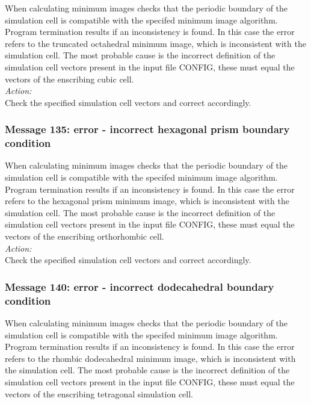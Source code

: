 When calculating minimum images \D{} checks that the periodic
boundary of the simulation cell is compatible with the specifed
minimum image algorithm. Program termination results if an
inconsistency is found. In this case the error refers to the truncated
octahedral minimum image, which is inconsistent with the simulation
cell. The most probable cause is the incorrect definition of the
simulation cell vectors present in the input file CONFIG, these must
equal the vectors of the enscribing cubic cell. \\ 

\noindent
{\em Action:} \\ 
Check the specified simulation cell vectors and correct accordingly.

\subsubsection*{Message 135: error - incorrect hexagonal prism boundary condition}

When calculating minimum images \D{} checks that the periodic
boundary of the simulation cell is compatible with the specifed
minimum image algorithm. Program termination results if an
inconsistency is found. In this case the error refers to the hexagonal
prism minimum image, which is inconsistent with the simulation
cell. The most probable cause is the incorrect definition of the
simulation cell vectors present in the input file CONFIG, these must
equal the vectors of the enscribing orthorhombic cell. \\ 

\noindent
{\em Action:} \\ 
Check the specified simulation cell vectors and correct accordingly.

\subsubsection*{Message 140: error - incorrect dodecahedral boundary condition}

When calculating minimum images \D{} checks that the periodic
boundary of the simulation cell is compatible with the specifed
minimum image algorithm. Program termination results if an
inconsistency is found. In this case the error refers to the rhombic
dodecahedral minimum image, which is inconsistent with the simulation
cell. The most probable cause is the incorrect definition of the
simulation cell vectors present in the input file CONFIG, these must
equal the vectors of the enscribing tetragonal simulation cell. \\ 

